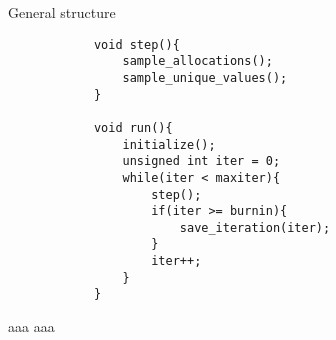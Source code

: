\begin{frame}[fragile]{General structure} %
	\begin{verbatim}
            void step(){
                sample_allocations();
                sample_unique_values();
            }

            void run(){
                initialize();
                unsigned int iter = 0;
                while(iter < maxiter){
                    step();
                    if(iter >= burnin){
                        save_iteration(iter);
                    }
                    iter++;
                }
            }
	\end{verbatim}
\end{frame}

\begin{frame}{aaa} %
	aaa
\end{frame}


